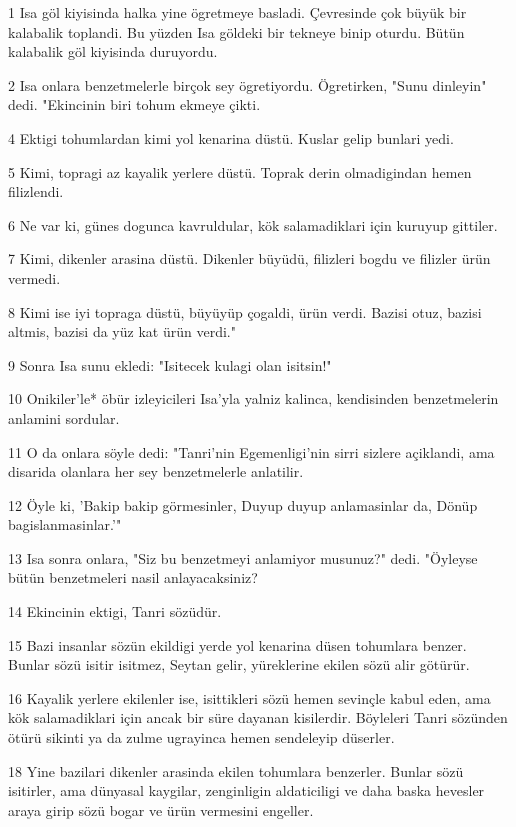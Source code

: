 \par 1 Isa göl kiyisinda halka yine ögretmeye basladi. Çevresinde çok büyük bir kalabalik toplandi. Bu yüzden Isa göldeki bir tekneye binip oturdu. Bütün kalabalik göl kiyisinda duruyordu.
\par 2 Isa onlara benzetmelerle birçok sey ögretiyordu. Ögretirken, "Sunu dinleyin" dedi. "Ekincinin biri tohum ekmeye çikti.
\par 4 Ektigi tohumlardan kimi yol kenarina düstü. Kuslar gelip bunlari yedi.
\par 5 Kimi, topragi az kayalik yerlere düstü. Toprak derin olmadigindan hemen filizlendi.
\par 6 Ne var ki, günes dogunca kavruldular, kök salamadiklari için kuruyup gittiler.
\par 7 Kimi, dikenler arasina düstü. Dikenler büyüdü, filizleri bogdu ve filizler ürün vermedi.
\par 8 Kimi ise iyi topraga düstü, büyüyüp çogaldi, ürün verdi. Bazisi otuz, bazisi altmis, bazisi da yüz kat ürün verdi."
\par 9 Sonra Isa sunu ekledi: "Isitecek kulagi olan isitsin!"
\par 10 Onikiler'le* öbür izleyicileri Isa'yla yalniz kalinca, kendisinden benzetmelerin anlamini sordular.
\par 11 O da onlara söyle dedi: "Tanri'nin Egemenligi'nin sirri sizlere açiklandi, ama disarida olanlara her sey benzetmelerle anlatilir.
\par 12 Öyle ki, 'Bakip bakip görmesinler, Duyup duyup anlamasinlar da, Dönüp bagislanmasinlar.'"
\par 13 Isa sonra onlara, "Siz bu benzetmeyi anlamiyor musunuz?" dedi. "Öyleyse bütün benzetmeleri nasil anlayacaksiniz?
\par 14 Ekincinin ektigi, Tanri sözüdür.
\par 15 Bazi insanlar sözün ekildigi yerde yol kenarina düsen tohumlara benzer. Bunlar sözü isitir isitmez, Seytan gelir, yüreklerine ekilen sözü alir götürür.
\par 16 Kayalik yerlere ekilenler ise, isittikleri sözü hemen sevinçle kabul eden, ama kök salamadiklari için ancak bir süre dayanan kisilerdir. Böyleleri Tanri sözünden ötürü sikinti ya da zulme ugrayinca hemen sendeleyip düserler.
\par 18 Yine bazilari dikenler arasinda ekilen tohumlara benzerler. Bunlar sözü isitirler, ama dünyasal kaygilar, zenginligin aldaticiligi ve daha baska hevesler araya girip sözü bogar ve ürün vermesini engeller.
